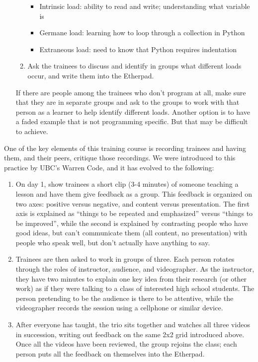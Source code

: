 \begin{itemize}
\begin{enumerate}
    \begin{itemize}
        \item
      Intrinsic load: ability to read and write; understanding what
      variable is
    \item
      Germane load: learning how to loop through a collection in Python
    \item
      Extraneous load: need to know that Python requires indentation
    \end{itemize}
  \item
    Ask the trainees to discuss and identify in groups what different
    loads occur, and write them into the Etherpad.
  \end{enumerate}

  If there are people among the trainees who don't program at all, make
  sure that they are in separate groups and ask to the groups to work
  with that person as a learner to help identify different loads.
  Another option is to have a faded example that is not programming
  specific. But that may be difficult to achieve.
\end{itemize}


One of the key elements of this training course is recording trainees
and having them, and their peers, critique those recordings. We were
introduced to this practice by UBC's Warren Code, and it has evolved to
the following:

\begin{enumerate}
\item
  On day 1, show trainees a short clip (3-4 minutes) of someone teaching
  a lesson and have them give feedback as a group. This feedback is
  organized on two axes: positive versus negative, and content versus
  presentation. The first axis is explained as ``things to be repeated
  and emphasized'' versus ``things to be improved'', while the second is
  explained by contrasting people who have good ideas, but can't
  communicate them (all content, no presentation) with people who speak
  well, but don't actually have anything to say.
\item
  Trainees are then asked to work in groups of three. Each person
  rotates through the roles of instructor, audience, and videographer.
  As the instructor, they have two minutes to explain one key idea from
  their research (or other work) as if they were talking to a class of
  interested high school students. The person pretending to be the
  audience is there to be attentive, while the videographer records the
  session using a cellphone or similar device.
\item
  After everyone has taught, the trio sits together and watches all
  three videos in succession, writing out feedback on the same 2x2 grid
  introduced above. Once all the videos have been reviewed, the group
  rejoins the class; each person puts all the feedback on themselves
  into the Etherpad.
\end{enumerate}

